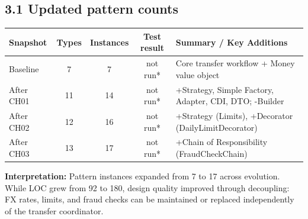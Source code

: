 \documentclass[11pt,a4paper]{article}
\begin{document}
\subsection{3.1 Updated pattern counts}
\begin{tabularx}{\linewidth}{@{}lcccY@{}}
\toprule
\textbf{Snapshot} & \textbf{Types} & \textbf{Instances} & \textbf{Test result} & \textbf{Summary / Key Additions} \\
\midrule
Baseline & 7 & 7 & not run* & Core transfer workflow + Money value object \\
After CH01 & 11 & 14 & not run* & +Strategy, Simple Factory, Adapter, CDI, DTO; -Builder \\
After CH02 & 12 & 16 & not run* & +Strategy (Limits), +Decorator (DailyLimitDecorator) \\
After CH03 & 13 & 17 & not run* & +Chain of Responsibility (FraudCheckChain) \\
\bottomrule
\end{tabularx}
\textbf{Interpretation:} Pattern instances expanded from 7 to 17 across evolution. While LOC grew from 92 to 180, design quality improved through decoupling: FX rates, limits, and fraud checks can be maintained or replaced independently of the transfer coordinator.
\end{document}
